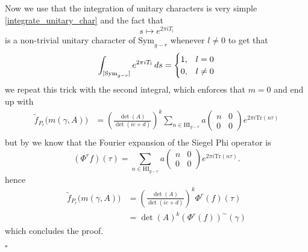 Now we use that the integration of unitary characters is very simple \ref{integrate_unitary_char} and the fact that 
\[s\mapsto  e^{2\pi iT_l} \]
is a non-trivial unitary character of \(\mathrm{Sym}_{g-r}\) whenever \(l\neq 0\) to get that 
\[\int^{}_{[\mathrm{Sym}_{g-r}]}  e^{2\pi iT_l}  \,ds = \begin{cases}
	1, & l=0 \\
	0, & l\neq 0
\end{cases}\]
we repeat this trick with the second integral, which enforces that \(m = 0\) and end up with 
\begin{align*}
	\tilde f_{P_r}\bigl(m(\gamma, A)\bigr)
	&=\left(\frac{\det(A)}{\det(ic + d)}\right)^{k} \sum_{n\in\mathrm{HI}_{g-r}} a\begin{pmatrix} n & 0\\ 0 & 0 \end{pmatrix}e^{2\pi i \mathrm{Tr} (n\tau)}\\
\end{align*}
but by \cite[3.5]{bruinier123ModularForms2008} we know that the Fourier expansion of the Siegel Phi operator is 
\[(\Phi^{r} f)(\tau) = \sum_{n\in\mathrm{HI}_{g-r}} a\begin{pmatrix} n & 0\\ 0 & 0 \end{pmatrix} e^{2\pi i\mathrm{Tr}(n \tau)}.\]
hence 
\begin{align*}
	\tilde f_{P_r}\bigl(m(\gamma, A)\bigr)
	&=\left(\frac{\det(A)}{\det(ic + d)}\right)^{k} \Phi^r(f)(\tau)\\
	&= \det(A)^k (\Phi^r(f))^{\sim}(\gamma)
\end{align*}
which concludes the proof.
\begin{FlushRight}
	\(\square\)
\end{FlushRight}